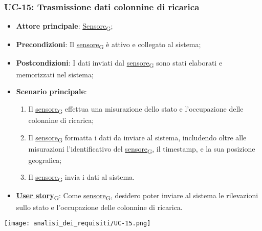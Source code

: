 \subsubsection{UC-15: Trasmissione dati colonnine di ricarica}
\begin{itemize}
	\item \textbf{Attore principale}: \href{https://7last.github.io/docs/rtb/documentazione-interna/glossario\#sensore}{Sensore\textsubscript{G}};
	\item \textbf{Precondizioni}: Il \href{https://7last.github.io/docs/rtb/documentazione-interna/glossario\#sensore}{sensore\textsubscript{G}} è attivo e collegato al sistema;
	\item \textbf{Postcondizioni}: I dati inviati dal \href{https://7last.github.io/docs/rtb/documentazione-interna/glossario\#sensore}{sensore\textsubscript{G}} sono stati elaborati e memorizzati nel sistema;
	\item \textbf{Scenario principale}:
	      \begin{enumerate}
		      \item Il \href{https://7last.github.io/docs/rtb/documentazione-interna/glossario\#sensore}{sensore\textsubscript{G}} effettua una misurazione dello stato e l'occupazione delle colonnine di ricarica;
		      \item Il \href{https://7last.github.io/docs/rtb/documentazione-interna/glossario\#sensore}{sensore\textsubscript{G}} formatta i dati da inviare al sistema, includendo oltre alle misurazioni l'identificativo del \href{https://7last.github.io/docs/rtb/documentazione-interna/glossario\#sensore}{sensore\textsubscript{G}},
		            il timestamp, e la sua posizione geografica;
		      \item Il \href{https://7last.github.io/docs/rtb/documentazione-interna/glossario\#sensore}{sensore\textsubscript{G}} invia i dati al sistema.
	      \end{enumerate}
	\item \href{https://7last.github.io/docs/rtb/documentazione-interna/glossario\#user-story}{\textbf{User story}\textsubscript{G}}: Come \href{https://7last.github.io/docs/rtb/documentazione-interna/glossario\#sensore}{sensore\textsubscript{G}}, desidero poter inviare al sistema le rilevazioni sullo stato e l'occupazione delle colonnine di ricarica.
\end{itemize}

\begin{center}
	\texttt{[image: analisi\_dei\_requisiti/UC-15.png]}
\end{center}

